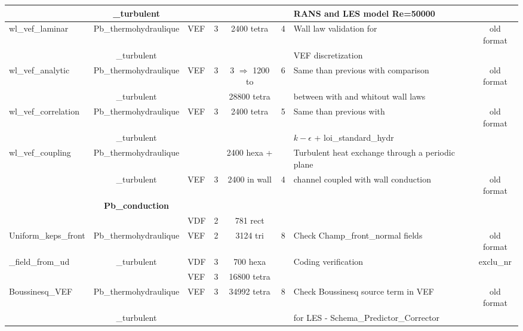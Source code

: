 \begin{table}[H]
\begin{centering}
\begin{tabular}{lclccclc}
\rowcolor{Blue!10} & \_turbulent & & & & & RANS and LES model Re=50000 & \\ \hline
\rowcolor{Blue!10}wl\_vef\_laminar & Pb\_thermohydraulique & VEF & 3 & 2400 tetra & 4 & Wall law validation for & old format \\ 
\rowcolor{Blue!10} & \_turbulent & & & & & VEF discretization & \\ \hline
\rowcolor{Blue!10}wl\_vef\_analytic & Pb\_thermohydraulique & VEF & 3 & 3 $\Rightarrow$ 1200 to  & 6 & Same than previous with comparison & old format \\ 
\rowcolor{Blue!10} & \_turbulent & & & 28800 tetra & & between with and whitout wall laws &  \\ \hline
\rowcolor{Blue!10}wl\_vef\_correlation & Pb\_thermohydraulique & VEF & 3 & 2400 tetra & 5 & Same than previous with & old format \\ 
\rowcolor{Blue!10} & \_turbulent & & & & &  $k-\epsilon$ + loi\_standard\_hydr & \\ \hline
\rowcolor{Blue!10}wl\_vef\_coupling & Pb\_thermohydraulique & & & 2400 hexa + & & Turbulent heat exchange through a periodic plane & \\ 
\rowcolor{Blue!10} & \_turbulent & VEF & 3 & 2400 in wall & 4 & channel coupled with wall conduction & old format \\ 
\rowcolor{Blue!10} & \textbf{Pb\_conduction} & & & & & & \\ \hline
\rowcolor{Blue!10} & & VDF & 2 & 781 rect & & & \\
\rowcolor{Blue!10}Uniform\_keps\_front & Pb\_thermohydraulique & VEF & 2 & 3124 tri & 8 & Check Champ\_front\_normal fields & old format \\ 
\rowcolor{Blue!10}\_field\_from\_ud & \_turbulent & VDF & 3 & 700 hexa & & Coding verification & exclu\_nr\\ 
\rowcolor{Blue!10} & & VEF & 3 & 16800 tetra & & & \\\hline
\rowcolor{Blue!10}Boussinesq\_VEF & Pb\_thermohydraulique & VEF & 3 & 34992 tetra & 8 & Check Boussinesq source term in VEF & old format \\ 
\rowcolor{Blue!10} & \_turbulent & & & & & for LES - Schema\_Predictor\_Corrector & \\ \hline
	\end{tabular}
\end{centering}
\end{table}

\newpage

